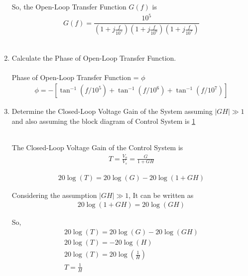 \begin{enumerate}[label=\thesubsection.\arabic*.,ref=\thesubsection.\theenumi]
So, the Open-Loop Transfer Function $G(f)$ is
\begin{align}
	G(f) = \dfrac{10^{5}}{\left(1+j\frac{f}{10^{5}}\right)\left(1+j\frac{f}{10^{6}}\right)\left(1+j\frac{f}{10^{7}}\right)}
\end{align}\\
\item Calculate the Phase of Open-Loop Transfer Function.\\
\solution\\
Phase of Open-Loop Transfer Function = $\phi$
\begin{align}
\phi=-\left[\tan ^{-1}\left(f / 10^{5}\right)+\tan ^{-1}\left(f / 10^{6}\right)+\tan ^{-1}\left(f / 10^{7}\right)\right]
\end{align}
\item Determine the Closed-Loop Voltage Gain of the System assuming $|GH|\gg1$ and also assuming the block diagram of Control System is \ref{fig:Control}
\begin{figure}[ht!]
	\begin{center}
		\resizebox{\columnwidth/1}{!}{}
	\end{center}
	\caption{}
	\label{fig:Control}
\end{figure}

\solution\\
The Closed-Loop Voltage Gain of the Control System is\\
\begin{align}
T = \frac{V_{o}}{V_{s}} = \frac{G}{1+GH}
\end{align}

\begin{align}
20\log(T) = 20\log(G) - 20\log(1+GH)
\end{align}

Considering the assumption $|GH| \gg 1$, It can be written as
\begin{align}
20\log(1+GH) = 20\log(GH)
\end{align}

So,
\begin{align}
20\log(T) = 20\log(G) - 20\log(GH) \\
20\log(T) = -20\log(H) \\
20\log(T)= 20\log(\frac{1}{H})\\
T = \frac{1}{H}
\end{align}


\end{enumerate}
